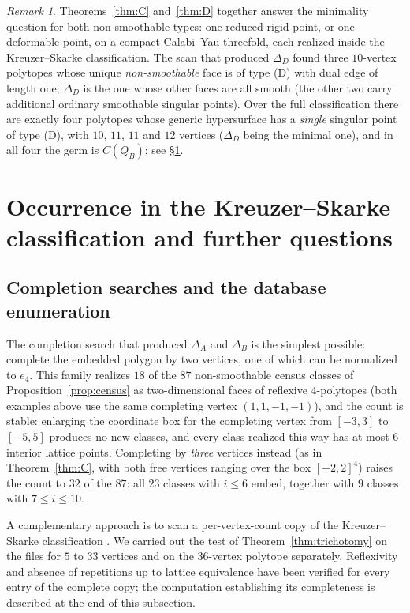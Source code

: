 \documentclass[11pt]{amsart}
\theoremstyle{definition}
\theoremstyle{remark}
\newtheorem{remark}[theorem]{Remark}
\begin{document}
\begin{remark}
Theorems~\ref{thm:C} and~\ref{thm:D} together answer the minimality
question for both non-smoothable types: one reduced-rigid point, or one deformable
point, on a compact Calabi--Yau threefold, each realized inside the
Kreuzer--Skarke classification.  The scan that produced $\Delta_D$ found
three $10$-vertex polytopes whose unique \emph{non-smoothable} face is of
type \textup{(D)} with dual edge of length one; $\Delta_D$ is the one whose
other faces are all smooth (the other two carry additional ordinary
smoothable singular points).  Over the full classification there are exactly four
polytopes whose generic hypersurface has a \emph{single}
singular point of type \textup{(D)}, with $10$, $11$, $11$ and $12$ vertices
($\Delta_D$ being the minimal one), and in all four the germ is $C(Q_B)$;
see \S\ref{sec:questions}.
\end{remark}

\section{Occurrence in the Kreuzer--Skarke classification and further questions}\label{sec:questions}

\subsection{Completion searches and the database enumeration}
The completion search that produced $\Delta_A$ and $\Delta_B$ is the simplest
possible: complete the embedded polygon by two vertices, one of which can be
normalized to $e_4$.  This family realizes $18$ of the $87$ non-smoothable
census classes of Proposition~\ref{prop:census} as two-dimensional faces of
reflexive $4$-polytopes (both examples above use the same completing vertex
$(1,1,-1,-1)$), and the count is stable: enlarging the coordinate box for
the completing vertex from $[-3,3]$ to $[-5,5]$ produces no new classes, and
every class realized this way has at most $6$ interior lattice points.
Completing by \emph{three} vertices instead (as in
Theorem~\ref{thm:C}, with both free vertices ranging over the box
$[-2,2]^4$) raises the count to $32$ of the $87$: all $23$ classes with
$i \le 6$ embed, together with $9$ classes with $7 \le i \le 10$.

A complementary approach is to scan a
per-vertex-count copy of the Kreuzer--Skarke classification
\cite{KreuzerSkarke00}.  We carried out the test of
Theorem~\ref{thm:trichotomy} on the files for $5$ to $33$ vertices and on
the $36$-vertex polytope separately.  Reflexivity and absence of repetitions
up to lattice equivalence have been verified for every entry of the
complete copy; the computation establishing its completeness is described
at the end of this subsection.
\end{document}
